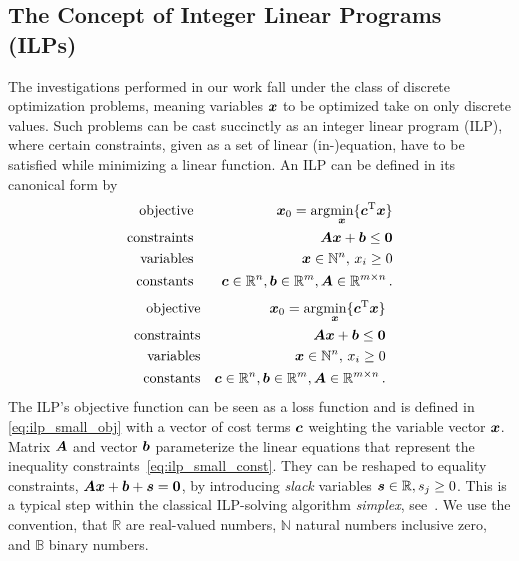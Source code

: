 \documentclass[utf8, nocrop]{FrontiersinHarvardArxiv}
\def\N{\mathbb{N}}
\def\R{\mathbb{R}}
\def\B{\mathbb{B}}
\def\ve#1{\mathlette{\boldmath}{#1}}
\def\mathlette#1#2{{\mathchoice{\mbox{#1$\displaystyle #2$}}%
        {\mbox{#1$\textstyle #2$}}%
        {\mbox{#1$\scriptstyle #2$}}%
        {\mbox{#1$\scriptscriptstyle #2$}}}}
\def\T{\mathrm{T}}
\def\argmin#1{\mathrm{arg}\underset{#1}{\mathrm{min}}}
\begin{document}
\subsection{The Concept of Integer Linear Programs (ILPs)}
The investigations performed in our work fall under the class of discrete optimization problems, meaning variables $\ve x$ to be optimized take on only discrete values.  Such problems can be cast succinctly as an integer linear program (ILP), 
where certain constraints, given as a set of linear (in-)equation, have to be satisfied while minimizing a linear function. An ILP can be defined in its canonical form by
\iflatexml
\begin{align}
	\mathrm{objective}&\quad &\ve x_0 = \argmin{\ve x}\{\ve c^\T\ve x\}\label{eq:ilp_small_obj}\\
	\mathrm{constraints}&\quad &\ve A \ve x+\ve b \leq \ve 0\label{eq:ilp_small_const}\\
	\mathrm{variables}&\quad &\ve x \in \N^n,\, x_i \geq 0\label{eq:ilp_small_var}\\
	\mathrm{constants}&\quad &\ve c \in \R^n, \ve b \in \R^m, \ve A \in \R^{m\times n}\label{eq:ilp_constants}\,.
\end{align}
\else
\begin{eqnarray}
    \text{objective} &&\ve x_0 = \argmin{\ve x}\{\ve c^\T\ve x\}\label{eq:ilp_small_obj}\\
    \text{constraints} &&\ve A \ve x+\ve b \leq \ve 0\label{eq:ilp_small_const}\\
    \text{variables} &&\ve x \in \N^n,\, x_i \geq 0\label{eq:ilp_small_var}\\
    \text{constants} &&\ve c \in \R^n, \ve b \in \R^m, \ve A \in \R^{m\times n}\label{eq:ilp_constants}\,.
\end{eqnarray}
\fi
The ILP's objective function can be seen as a loss function and is defined in \eqref{eq:ilp_small_obj} with a vector of cost terms $\ve c$ weighting the variable vector $\ve x$. Matrix $\ve A$ and vector $\ve b$ parameterize the linear equations that represent the inequality constraints~\eqref{eq:ilp_small_const}. They can be reshaped to equality constraints, $\ve A\ve x+\ve b + \ve s= \ve 0$, by introducing \emph{slack} variables $\ve s\in \R, s_j \geq 0$. This is a typical step within the classical ILP-solving algorithm \emph{simplex}, see~\cite{simplex}.  
We use the convention, that $\R$ are real-valued numbers, $\N$ natural numbers inclusive zero, and $\B$ binary numbers. 
\end{document}
